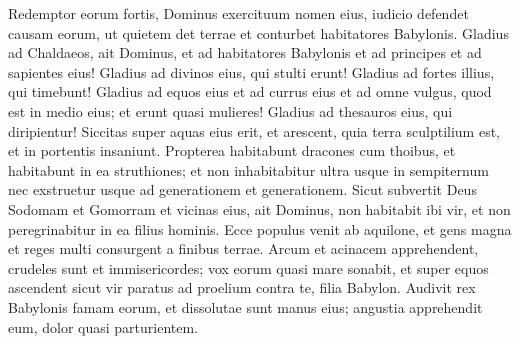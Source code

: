 \begin{biblechapter}
\begin{biblechapter}
\begin{biblechapter}
\begin{biblechapter}
\begin{biblechapter}
\begin{biblechapter}
\begin{biblechapter}
\begin{biblechapter}
\begin{biblechapter}
\begin{biblechapter}
\begin{biblechapter}
\begin{biblechapter}
\begin{biblechapter}
\begin{biblechapter}
\begin{biblechapter}
\begin{biblechapter}
\begin{biblechapter}
\begin{biblechapter}
\begin{biblechapter}
\begin{biblechapter}
\begin{biblechapter}
\begin{biblechapter}
\begin{biblechapter}
\begin{biblechapter}
\begin{biblechapter}
\begin{biblechapter}
\begin{biblechapter}
\begin{biblechapter}
\begin{biblechapter}
\begin{biblechapter}
\begin{biblechapter}
\begin{biblechapter}
\begin{biblechapter}
\begin{biblechapter}
\begin{biblechapter}
\begin{biblechapter}
\begin{biblechapter}
\begin{biblechapter}
\begin{biblechapter}
\begin{biblechapter}
\begin{biblechapter}
\begin{biblechapter}
\begin{biblechapter}
\begin{biblechapter}
\begin{biblechapter}
\begin{biblechapter}
\begin{biblechapter}
\begin{biblechapter}
\begin{biblechapter}
\begin{biblechapter}
\verse Redemptor eorum fortis, Dominus exercituum nomen eius, iudicio defendet causam eorum, ut quietem det terrae et conturbet habitatores Babylonis.
 \verse Gladius ad Chaldaeos,
 ait Dominus,
 et ad habitatores Babylonis
 et ad principes et ad sapientes eius! 
\verse Gladius ad divinos eius, qui stulti erunt!
 Gladius ad fortes illius, qui timebunt!
 \verse Gladius ad equos eius et ad currus eius
 et ad omne vulgus, quod est in medio eius;
 et erunt quasi mulieres!
 Gladius ad thesauros eius, qui diripientur!
 \verse Siccitas super aquas eius erit, et arescent,
 quia terra sculptilium est,
 et in portentis insaniunt.
 \verse Propterea habitabunt dracones cum thoibus, et habitabunt in ea struthiones; et non inhabitabitur ultra usque in sempiternum nec exstruetur usque ad generationem et generationem. 
\verse Sicut subvertit Deus Sodomam et Gomorram et vicinas eius, ait Dominus, non habitabit ibi vir, et non peregrinabitur in ea filius hominis. 
\verse Ecce populus venit ab aquilone, et gens magna et reges multi consurgent a finibus terrae. 
\verse Arcum et acinacem apprehendent, crudeles sunt et immisericordes; vox eorum quasi mare sonabit, et super equos ascendent sicut vir paratus ad proelium contra te, filia Babylon. 
\verse Audivit rex Babylonis famam eorum, et dissolutae sunt manus eius; angustia apprehendit eum, dolor quasi parturientem. 

\end{biblechapter}
\end{biblechapter}
\end{biblechapter}
\end{biblechapter}
\end{biblechapter}
\end{biblechapter}
\end{biblechapter}
\end{biblechapter}
\end{biblechapter}
\end{biblechapter}
\end{biblechapter}
\end{biblechapter}
\end{biblechapter}
\end{biblechapter}
\end{biblechapter}
\end{biblechapter}
\end{biblechapter}
\end{biblechapter}
\end{biblechapter}
\end{biblechapter}
\end{biblechapter}
\end{biblechapter}
\end{biblechapter}
\end{biblechapter}
\end{biblechapter}
\end{biblechapter}
\end{biblechapter}
\end{biblechapter}
\end{biblechapter}
\end{biblechapter}
\end{biblechapter}
\end{biblechapter}
\end{biblechapter}
\end{biblechapter}
\end{biblechapter}
\end{biblechapter}
\end{biblechapter}
\end{biblechapter}
\end{biblechapter}
\end{biblechapter}
\end{biblechapter}
\end{biblechapter}
\end{biblechapter}
\end{biblechapter}
\end{biblechapter}
\end{biblechapter}
\end{biblechapter}
\end{biblechapter}
\end{biblechapter}
\end{biblechapter}
